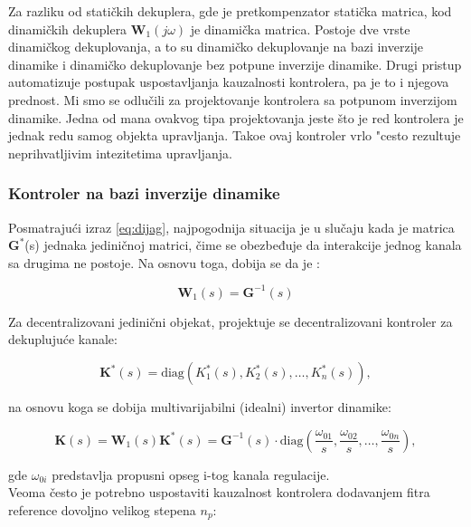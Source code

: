 \documentclass[a4paper,11pt]{article}
\theoremstyle{definition} \newtheorem{deff}{Definicija}[section]
\theoremstyle{definition} \newtheorem{prim}[deff]{Primer}
\theoremstyle{plain} \newtheorem{teor}[deff]{Teorema}
\begin{document}
	Za razliku od statičkih dekuplera, gde je pretkompenzator statička matrica, kod dinamičkih dekuplera $\textbf{W}_1(j\omega)$ je dinamička matrica. Postoje dve vrste dinamičkog dekuplovanja, a to su dinamičko dekuplovanje na bazi inverzije dinamike i dinamičko dekuplovanje bez potpune inverzije dinamike. Drugi pristup automatizuje postupak uspostavljanja kauzalnosti kontrolera, pa je to i njegova prednost. Mi smo se odlučili za projektovanje kontrolera sa potpunom inverzijom dinamike. Jedna od mana ovakvog tipa projektovanja jeste što je red kontrolera je jednak redu samog objekta upravljanja. Tako\dj{}e ovaj kontroler vrlo "cesto rezultuje neprihvatljivim intezitetima upravljanja. \\
	
	
	
	\subsubsection{Kontroler na bazi inverzije dinamike}
	
	Posmatrajući izraz \eqref{eq:dijag}, najpogodnija situacija je u slučaju kada je matrica $\textbf{G}^*$(s) jednaka jediničnoj matrici, čime se obezbeđuje da interakcije jednog kanala sa drugima ne postoje. Na osnovu toga, dobija se da je  :
	
	\begin{equation}
		\textbf{W}_1(s) = \textbf{G}^{-1}(s)
	\end{equation}
	
	Za decentralizovani jedinični objekat, projektuje se decentralizovani kontroler za dekuplujuće kanale: 
	
	\begin{equation}
		\mathbf{K}^*(s) = \text{diag}({K}_1^*(s), {K}_2^*(s), \dots, {K}_n^*(s)) , 
	\end{equation}
	
	\noindent na osnovu koga se dobija multivarijabilni (idealni) invertor dinamike: 
	
	\begin{equation}
		\textbf{K}(s) = \textbf{W}_1(s) \textbf{K}^*(s) = \textbf{G}^{-1}(s) \cdot \mathrm{diag}(\frac{\omega_{01}}{s}, \frac{\omega_{02}}{s}, \dots, \frac{\omega_{0n}}{s}), 
	\end{equation}
	
	\noindent gde $\omega_{0i}$ predstavlja propusni opseg i-tog kanala regulacije.\\
	
	Veoma često je potrebno uspostaviti kauzalnost kontrolera dodavanjem fitra reference dovoljno velikog stepena $n_p$:
	
\end{document}
